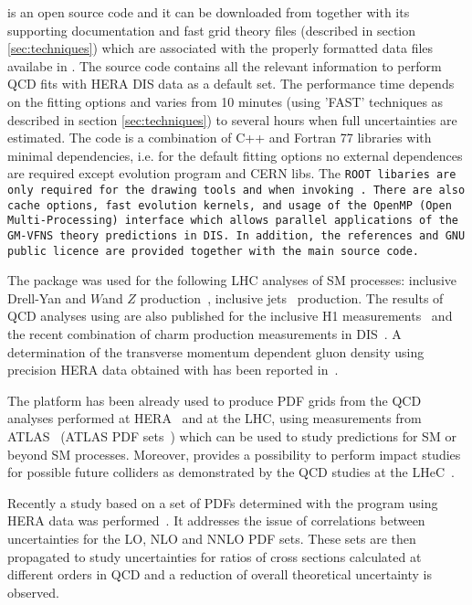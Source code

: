 
\fitter is an open source code and it can be downloaded from \cite{herafitter:page}
together with its supporting documentation and 
fast grid theory files (described in section \ref{sec:techniques}) which are associated with the properly formatted data files availabe in \fitter.
The source code contains all the relevant information to perform QCD fits with HERA DIS data as a default set. The performance time depends on the fitting options and varies from 10 minutes 
(using 'FAST' techniques as described in section \ref{sec:techniques}) to several hours when full uncertainties are estimated. The \fitter code is a combination of C++ and Fortran 77 libraries with minimal 
dependencies, i.e. for the default fitting options no external dependences are required  except \qcdnum evolution program \cite{qcdnum} and CERN libs. The \tt ROOT \rm  libaries are only required for the drawing tools and when invoking \applgrid\rm.  
There are also cache options, fast evolution kernels, and usage of the OpenMP (Open Multi-Processing)  interface which allows parallel applications of the GM-VFNS theory predictions in DIS. 
In addition, the \fitter references and GNU public licence are provided 
together with the main source code. 


The \fitter package was used for the following LHC analyses of SM processes:
inclusive Drell-Yan and $W$and $Z$ 
production~\cite{atlas:strange,atlas:hm,cms:strange},
inclusive jets~\cite{atlas:jets} production.
The results of QCD analyses using \fitter are also
published for the inclusive H1 measurements~\cite{h1:2012kk}
and the recent combination of charm production measurements 
in DIS~\cite{h1zeus:charm}.
A determination of the transverse momentum dependent gluon density using precision HERA data obtained with \fitter has been reported in~\cite{Jung2014}. 


The \fitter platform has been already used to produce PDF grids 
from the QCD analyses performed at 
HERA~\cite{h1zeus:2009wt,hera:grids} and at the LHC, using 
measurements from ATLAS~\cite{atlas:strange,atlas:jets} (ATLAS PDF sets~\cite{atlas:grids}) which can be used to study predictions for SM or beyond SM processes.  Moreover, \fitter provides a possibility to 
perform impact studies for possible future colliders
as demonstrated by the QCD studies at the LHeC~\cite{lhec:studies}.

Recently a study based on a set of PDFs 
determined with the \fitter program using HERA data was performed~\cite{hfcorrpaper}. It addresses the issue of correlations between uncertainties for the LO,
NLO and NNLO PDF sets. These sets are then propagated to study uncertainties 
for ratios of cross sections calculated at different orders in QCD and  
a reduction of overall theoretical uncertainty is observed.







